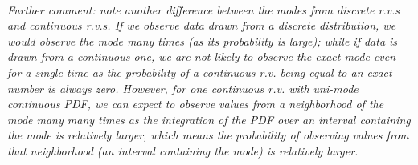 \begin{exercise} [BH.6.2]
\begin{solution}
	~\\
	\textit{Further comment: note another difference between the modes from discrete r.v.s and continuous r.v.s. If we observe data drawn from a discrete distribution, we would observe the mode many times (as its probability is large); while if data is drawn from a continuous one, we are not likely to observe the exact mode even for a single time as the probability of a continuous r.v. being equal to an exact number is always zero. However, for one continuous r.v. with uni-mode continuous PDF, we can expect to observe values from a neighborhood of the mode many many times as the integration of the PDF over an interval containing the mode is relatively larger, which means the probability of observing values from that neighborhood (an interval containing the mode) is relatively larger.}
\end{solution}
\end{exercise}

